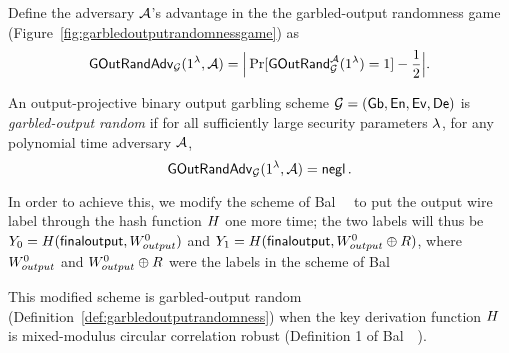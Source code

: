 Define the adversary $\mathcal{A}$'s advantage in the the garbled-output randomness game (Figure~\ref{fig:garbledoutputrandomnessgame}) as 
\[\mathsf{GOutRandAdv}_{\mathcal{G}}(1^{\lambda}, \mathcal{A}) = \Big|\Pr[\mathsf{GOutRand}^{\mathcal{A}}_{\mathcal{G}}(1^{\lambda}) = 1] - \frac{1}{2}\Big|.\]

\begin{definition}
\label{def:garbledoutputrandomness}

An output-projective binary output garbling scheme $\mathcal{G} = (\mathsf{Gb}, \mathsf{En}, \mathsf{Ev}, \mathsf{De})$ is \emph{garbled-output random} if 
for all sufficiently large security parameters $\lambda$, 
for any polynomial time adversary $\mathcal{A}$, 
\[\mathsf{GOutRandAdv}_{\mathcal{G}}(1^{\lambda}, \mathcal{A}) = \operatorname{\mathsf{negl}}.\]
\end{definition}

In order to achieve this, we modify the scheme of Bal~\etal~\cite{CCS:BalMalRos16} to put the output wire label through the hash function $H$ one more time; the two labels will thus be $Y_0 = H(\mathsf{finaloutput}, W_{output}^0)$ and $Y_1 = H(\mathsf{finaloutput}, W_{output}^0 \oplus R)$, where $W_{output}^0$ and $W_{output}^0 \oplus R$ were the labels in the scheme of Bal~\etal

\begin{theorem}
\label{theorem:garbledoutputrandomness}
This modified scheme is garbled-output random (Definition~\ref{def:garbledoutputrandomness}) when the key derivation function $H$ is mixed-modulus circular correlation robust (Definition 1 of Bal~\etal~\cite{CCS:BalMalRos16}).
\end{theorem}

